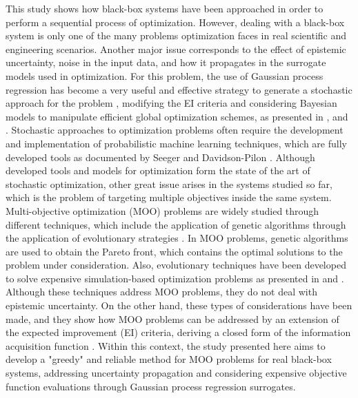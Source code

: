 \documentclass{article}
\begin{document}
This study shows how black-box systems have been approached in order to perform a sequential process of optimization. However, dealing with a black-box system is only one of the many problems optimization faces in real scientific and engineering scenarios. Another major issue corresponds to the effect of epistemic uncertainty, noise in the input data, and how it propagates in the surrogate models used in optimization. For this problem, the use of Gaussian process regression has become a very useful and effective strategy to generate a stochastic approach for the problem \cite{Wang2016}, modifying the EI criteria and considering Bayesian models to manipulate efficient global optimization schemes, as presented in \cite{Huang2006}, \cite{Pandita2016} and \cite{Li2014}. Stochastic approaches to optimization problems often require the development and implementation of probabilistic machine learning techniques, which are fully developed tools as documented by Seeger \cite{Seeger2004} and Davidson-Pilon \cite{Davidson-Pilon2014}. Although developed tools and models for optimization form the state of the art of stochastic optimization, other great issue arises in the systems studied so far, which is the problem of targeting multiple objectives inside the same system.\\

Multi-objective optimization (MOO) problems are widely studied through different techniques, which include the application of genetic algorithms through the application of evolutionary strategies \cite{Costa2006}. In MOO problems, genetic algorithms are used to obtain the Pareto front, which contains the optimal solutions to the problem under consideration. Also, evolutionary techniques have been developed to solve expensive simulation-based optimization problems as presented in \cite{Guo2007} and \cite{Huang2009}. Although these techniques address MOO problems, they do not deal with epistemic uncertainty. On the other hand, these types of considerations have been made, and they show how MOO problems can be addressed by an extension of the expected improvement (EI) criteria, deriving a closed form of the information acquisition function \cite{wagner2010expected}. Within this context, the study presented here aims to develop a "greedy" and reliable method for MOO problems for real black-box systems, addressing uncertainty propagation and considering expensive objective function evaluations through Gaussian process regression surrogates.\\
\end{document}
